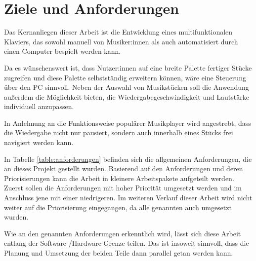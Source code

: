 \chapter{Ziele und Anforderungen} \label{Zielstellung}


Das Kernanliegen dieser Arbeit ist die Entwicklung eines multifunktionalen Klaviers,
das sowohl manuell von Musiker:innen als auch automatisiert durch einen Computer bespielt werden kann.

Da es wünschenswert ist, dass Nutzer:innen auf eine breite Palette fertiger Stücke zugreifen und diese Palette selbstständig erweitern können,
wäre eine Steuerung über den PC sinnvoll.
Neben der Auswahl von Musikstücken soll die Anwendung außerdem die Möglichkeit bieten,
die Wiedergabegeschwindigkeit und Lautstärke individuell anzupassen.

In Anlehnung an die Funktionsweise populärer Musikplayer wird angestrebt,
dass die Wiedergabe nicht nur pausiert, sondern auch innerhalb eines Stücks frei navigiert werden kann.

In Tabelle \ref{table:anforderungen} befinden sich die allgemeinen Anforderungen, die an dieses Projekt gestellt wurden.
Basierend auf den Anforderungen und deren Priorisierungen kann die Arbeit in kleinere Arbeitspakete aufgeteilt werden.
Zuerst sollen die Anforderungen mit hoher Priorität umgesetzt werden und im Anschluss jene mit einer niedrigeren.
Im weiteren Verlauf dieser Arbeit wird nicht weiter auf die Priorisierung eingegangen, da alle genannten auch umgesetzt wurden. %

Wie an den genannten Anforderungen erkenntlich wird, lässt sich diese Arbeit entlang der Software-/Hardware-Grenze teilen.
Das ist insoweit sinnvoll, dass die Planung und Umsetzung der beiden Teile dann parallel getan werden kann.

